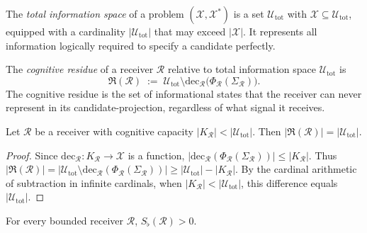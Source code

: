 \begin{definition}
\label{def:total-info}
The \emph{total information space} of a problem $(\mathcal{X}, \mathcal{X}^{*})$
is a set $\mathcal{U}_{\mathrm{tot}}$ with $\mathcal{X} \subseteq \mathcal{U}_{\mathrm{tot}}$,
equipped with a cardinality $|\mathcal{U}_{\mathrm{tot}}|$ that may exceed
$|\mathcal{X}|$.  It represents all information logically required to
specify a candidate perfectly.
\end{definition}

\begin{definition}
\label{def:residue}
The \emph{cognitive residue} of a receiver $\mathcal{R}$ relative to total
information space $\mathcal{U}_{\mathrm{tot}}$ is
\[
  \mathfrak{R}(\mathcal{R}) \;:=\;
  \mathcal{U}_{\mathrm{tot}}
  \setminus
  \mathrm{dec}_{\mathcal{R}}\!\bigl(\Phi_{\mathcal{R}}(\Sigma_{\mathcal{R}})\bigr) .
\]
The cognitive residue is the set of informational states that the receiver
can never represent in its candidate-projection, regardless of what signal it
receives.
\end{definition}

\begin{theorem}
\label{thm:cognitive-residue-persistence}
Let $\mathcal{R}$ be a receiver with cognitive capacity
$|K_{\mathcal{R}}| < |\mathcal{U}_{\mathrm{tot}}|$.  Then
$|\mathfrak{R}(\mathcal{R})| = |\mathcal{U}_{\mathrm{tot}}|$.
\end{theorem}

\begin{proof}
Since $\mathrm{dec}_{\mathcal{R}} : K_{\mathcal{R}} \to \mathcal{X}$ is a
function,
$|\mathrm{dec}_{\mathcal{R}}(\Phi_{\mathcal{R}}(\Sigma_{\mathcal{R}}))| \leq
|K_{\mathcal{R}}|$.
Thus
$|\mathfrak{R}(\mathcal{R})| = |\mathcal{U}_{\mathrm{tot}} \setminus
\mathrm{dec}_{\mathcal{R}}(\Phi_{\mathcal{R}}(\Sigma_{\mathcal{R}}))|
\geq |\mathcal{U}_{\mathrm{tot}}| - |K_{\mathcal{R}}|$.
By the cardinal arithmetic of subtraction in infinite cardinals, when
$|K_{\mathcal{R}}| < |\mathcal{U}_{\mathrm{tot}}|$, this difference equals
$|\mathcal{U}_{\mathrm{tot}}|$.
\end{proof}

\begin{theorem}
\label{thm:floor-positivity-cog}
For every bounded receiver $\mathcal{R}$, $S_\flat(\mathcal{R}) > 0$.
\end{theorem}

